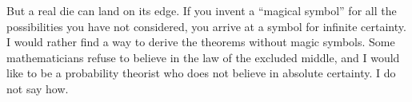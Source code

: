 But a real die can land on its edge. If you invent a ``magical symbol'' for all the possibilities you have not considered, you arrive at a symbol for infinite certainty.  I would rather find a way to derive the theorems without magic symbols. Some mathematicians refuse to believe in the law of the excluded middle, and I would like to be a probability theorist who does not believe in absolute certainty. I do not say how.
